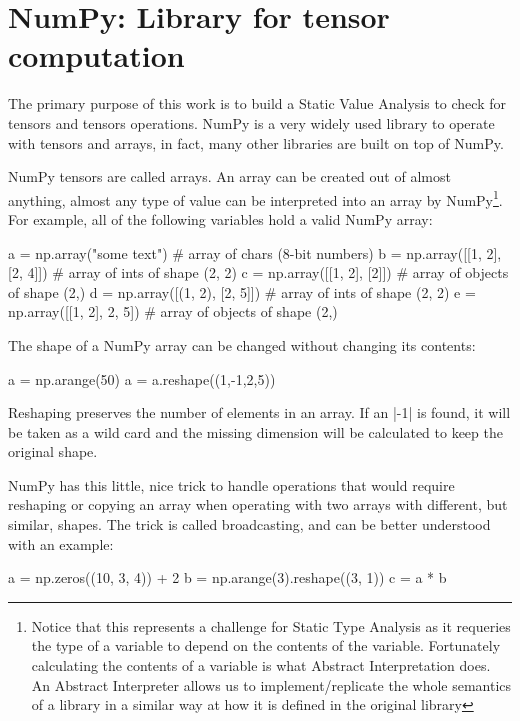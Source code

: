 \section{NumPy: Library for tensor computation}
\label{numpy-library-for-tensor-computation}

The primary purpose of this work is to build a Static Value Analysis to
check for tensors and tensors operations. NumPy
\autocite{oliphant2006guide} is a very widely used library to operate
with tensors and arrays, in fact, many other libraries are built on top
of NumPy.

NumPy tensors are called arrays. An array can be created out of almost
anything, almost any type of value can be interpreted into an array by
NumPy\footnote{Notice that this represents a challenge for Static Type
  Analysis as it requeries the type of a variable to depend on the
  contents of the variable. Fortunately calculating the contents of a
  variable is what Abstract Interpretation does. An Abstract Interpreter
  allows us to implement/replicate the whole semantics of a library in a
  similar way at how it is defined in the original library}. For
example, all of the following variables hold a valid NumPy array:

\begin{pythoncode}
a = np.array("some text")       # array of chars (8-bit numbers)
b = np.array([[1, 2], [2, 4]])  # array of ints of shape (2, 2)
c = np.array([[1, 2], [2]])     # array of objects of shape (2,)
d = np.array([(1, 2), [2, 5]])  # array of ints of shape (2, 2)
e = np.array([[1, 2], {2, 5}])     # array of objects of shape (2,)
\end{pythoncode}

The shape of a NumPy array can be changed without changing its contents:

\begin{pythoncode}
a = np.arange(50)
a = a.reshape((1,-1,2,5))
\end{pythoncode}

Reshaping preserves the number of elements in an array. If an
\pycode|-1| is found, it will be taken as a wild card and the missing
dimension will be calculated to keep the original shape.

NumPy has this little, nice trick to handle operations that would
require reshaping or copying an array when operating with two arrays
with different, but similar, shapes. The trick is called broadcasting,
and can be better understood with an example:

\begin{pythoncode}
a = np.zeros((10, 3, 4)) + 2
b = np.arange(3).reshape((3, 1))
c = a * b
\end{pythoncode}

